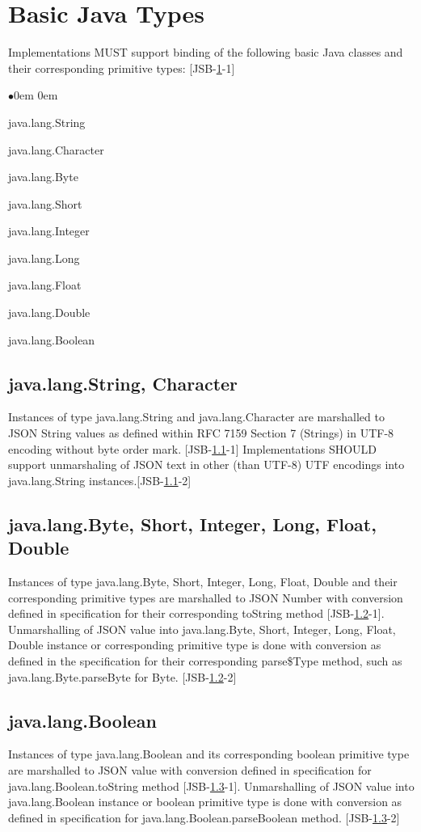 \section{Basic Java Types}
\label{sec:basic}
Implementations MUST support binding of the following basic Java classes and their corresponding primitive types: [JSB-\ref{sec:basic}-1]
\begin{list}{$\bullet$}{\parsep 0em  0em}
\item java.lang.String
\item java.lang.Character
\item java.lang.Byte
\item java.lang.Short
\item java.lang.Integer
\item java.lang.Long
\item java.lang.Float
\item java.lang.Double
\item java.lang.Boolean
\end{list}

\subsection{java.lang.String, Character}
\label{subsec:string}
Instances of type java.lang.String and java.lang.Character are marshalled to JSON String values as defined within RFC 7159 Section 7 (Strings) \cite{rfc7159} in UTF-8 encoding without byte order mark. [JSB-\ref{subsec:string}-1] Implementations SHOULD support unmarshaling of JSON text in other (than UTF-8) UTF encodings into java.lang.String instances.[JSB-\ref{subsec:string}-2]

\subsection{java.lang.Byte, Short, Integer, Long, Float, Double}
\label{subsec:number}
Instances of type java.lang.Byte, Short, Integer, Long, Float, Double and their corresponding primitive types are marshalled to JSON Number with conversion defined in specification for their corresponding toString method [JSB-\ref{subsec:number}-1]. Unmarshalling of JSON value into java.lang.Byte, Short, Integer, Long, Float, Double instance or corresponding primitive type is done with conversion as defined in the specification for their corresponding
parse\${Type} method, such as java.lang.Byte.parseByte for Byte. [JSB-\ref{subsec:number}-2]

\subsection{java.lang.Boolean}
\label{subsec:boolean}
Instances of type java.lang.Boolean and its corresponding boolean primitive type are marshalled to JSON value with conversion defined in specification for java.lang.Boolean.toString method [JSB-\ref{subsec:boolean}-1]. Unmarshalling of JSON value into java.lang.Boolean instance or boolean primitive type is done with conversion as defined in specification for java.lang.Boolean.parseBoolean method. [JSB-\ref{subsec:boolean}-2]

